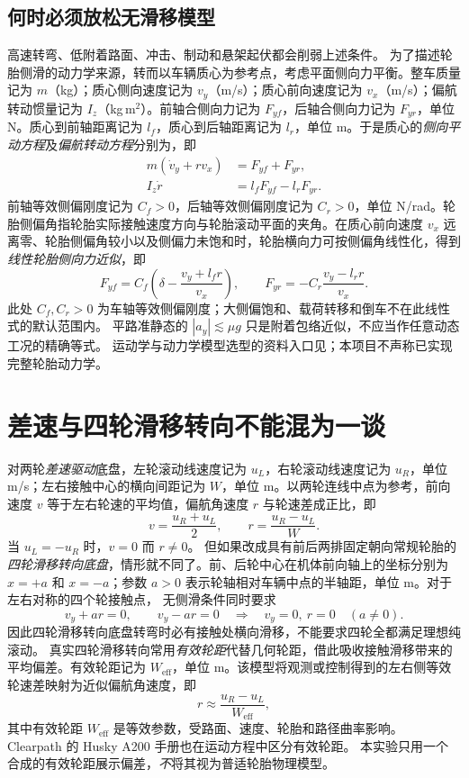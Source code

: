 \documentclass[UTF8,a4paper,fontset=fandol,11pt]{ctexart}
\begin{document}
\subsection{何时必须放松无滑移模型}
高速转弯、低附着路面、冲击、制动和悬架起伏都会削弱上述条件。
为了描述轮胎侧滑的动力学来源，转而以车辆质心为参考点，考虑平面侧向力平衡。整车质量记为 $m$（kg）；质心侧向速度记为 $v_y$（m/s）；质心前向速度记为 $v_x$（m/s）；偏航转动惯量记为 $I_z$（kg\,m$^2$）。前轴合侧向力记为 $F_{yf}$，后轴合侧向力记为 $F_{yr}$，单位 N。质心到前轴距离记为 $l_f$，质心到后轴距离记为 $l_r$，单位 m。于是质心的\emph{侧向平动方程}及\emph{偏航转动方程}分别为，即
\begin{align}
 m(\dot v_y+r v_x)&=F_{yf}+F_{yr},\\
 I_z\dot r&=l_fF_{yf}-l_rF_{yr}.
\end{align}
前轴等效侧偏刚度记为 $C_f>0$，后轴等效侧偏刚度记为 $C_r>0$，单位 N/rad。轮胎侧偏角指轮胎实际接触速度方向与轮胎滚动平面的夹角。在质心前向速度 $v_x$ 远离零、轮胎侧偏角较小以及侧偏力未饱和时，轮胎横向力可按侧偏角线性化，得到\emph{线性轮胎侧向力近似}，即
\begin{equation}
 F_{yf}=C_f\left(\delta-\frac{v_y+l_f r}{v_x}\right),\qquad
 F_{yr}=-C_r\frac{v_y-l_r r}{v_x}.
\end{equation}
此处 $C_f,C_r>0$ 为车轴等效侧偏刚度；大侧偏饱和、载荷转移和倒车不在此线性式的默认范围内。
平路准静态的 $|a_y|\lesssim\mu g$ 只是附着包络近似，不应当作任意动态工况的精确等式。
运动学与动力学模型选型的资料入口见\cite{kong}；本项目不声称已实现完整轮胎动力学。

\section{差速与四轮滑移转向不能混为一谈}
对两轮\emph{差速驱动}底盘，左轮滚动线速度记为 $u_L$，右轮滚动线速度记为 $u_R$，单位 m/s；左右接触中心的横向间距记为 $W$，单位 m。以两轮连线中点为参考，前向速度 $v$ 等于左右轮速的平均值，偏航角速度 $r$ 与轮速差成正比，即
\begin{equation}\label{eq:diff}
 v=\frac{u_R+u_L}{2},\qquad r=\frac{u_R-u_L}{W}.
\end{equation}
当 $u_L=-u_R$ 时，$v=0$ 而 $r\ne0$。
但如果改成具有前后两排固定朝向常规轮胎的\emph{四轮滑移转向底盘}，情形就不同了。前、后轮中心在机体前向轴上的坐标分别为 $x=+a$ 和 $x=-a$；参数 $a>0$ 表示轮轴相对车辆中点的半轴距，单位 m。对于左右对称的四个轮接触点，
无侧滑条件同时要求
\begin{equation}\label{eq:skid}
 v_y+a r=0,\qquad v_y-a r=0
 \quad\Longrightarrow\quad v_y=0,\ r=0\quad(a\ne0).
\end{equation}
因此四轮滑移转向底盘转弯时必有接触处横向滑移，不能要求四轮全都满足理想纯滚动。
真实四轮滑移转向常用\emph{有效轮距}代替几何轮距，借此吸收接触滑移带来的平均偏差。有效轮距记为 $W_{\mathrm{eff}}$，单位 m。该模型将观测或控制得到的左右侧等效轮速差映射为近似偏航角速度，即
\begin{equation}
 r\approx\frac{u_R-u_L}{W_{\mathrm{eff}}},
\end{equation}
其中有效轮距 $W_{\mathrm{eff}}$ 是等效参数，受路面、速度、轮胎和路径曲率影响\cite{skidpaper}。
Clearpath 的 Husky A200 手册也在运动方程中区分有效轮距\cite{husky}。
本实验只用一个合成的有效轮距展示偏差，\emph{不}将其视为普适轮胎物理模型。
\end{document}
